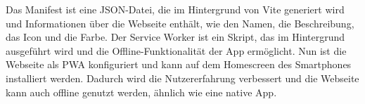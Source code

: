 Das Manifest ist eine \acf{JSON}-Datei, die im Hintergrund von Vite generiert wird und Informationen über die Webseite enthält, wie den Namen, die Beschreibung, das Icon und die Farbe. Der Service Worker ist ein Skript, das im Hintergrund ausgeführt wird und die Offline-Funktionalität der App ermöglicht. Nun ist die Webseite als \acs{PWA} konfiguriert und kann auf dem Homescreen des Smartphones installiert werden. Dadurch wird die Nutzererfahrung verbessert und die Webseite kann auch offline genutzt werden, ähnlich wie eine native App. \cite{vite-plugin-pwa}












